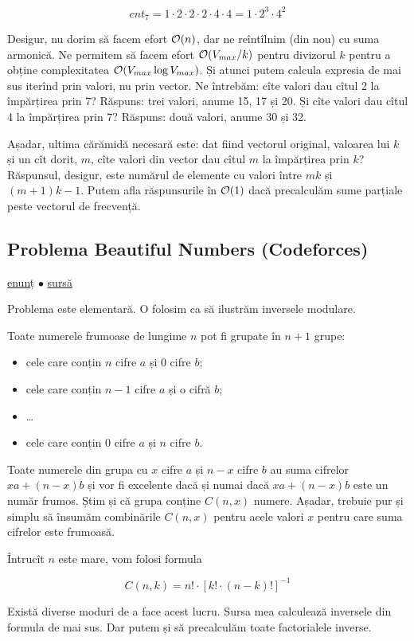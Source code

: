 \documentclass[../main.tex]{subfiles}
\begin{document}
$$cnt_7 = 1 \cdot 2 \cdot 2 \cdot 2 \cdot 4 \cdot 4 = 1 \cdot 2^3 \cdot 4^2$$

Desigur, nu dorim să facem efort $\mathcal{O}(n)$, dar ne reîntîlnim (din nou) cu suma armonică. Ne permitem să facem efort $\mathcal{O}(V_{max} / k)$ pentru divizorul $k$ pentru a obține complexitatea $\mathcal{O}(V_{max} \log V_{max})$. Și atunci putem calcula expresia de mai sus iterînd prin valori, nu prin vector. Ne întrebăm: cîte valori dau cîtul 2 la împărțirea prin 7? Răspuns: trei valori, anume 15, 17 și 20. Și cîte valori dau cîtul 4 la împărțirea prin 7? Răspuns: două valori, anume 30 și 32.

Așadar, ultima cărămidă necesară este: dat fiind vectorul original, valoarea lui $k$ și un cît dorit, $m$, cîte valori din vector dau cîtul $m$ la împărțirea prin $k$? Răspunsul, desigur, este numărul de elemente cu valori între $mk$ și $(m + 1)k - 1$. Putem afla răspunsurile în $\mathcal{O}(1)$ dacă precalculăm sume parțiale peste vectorul de frecvență.


\subsection{Problema Beautiful Numbers (Codeforces)}
\label{problem:beautiful-numbers}

\href{https://codeforces.com/contest/300/problem/C}{enunț}
$\bullet$
\hyperref[code:beautiful-numbers]{sursă}

Problema este elementară. O folosim ca să ilustrăm inversele modulare.

Toate numerele frumoase de lungime $n$ pot fi grupate în $n + 1$ grupe:

\begin{itemize}
  \item cele care conțin $n$ cifre $a$ și $0$ cifre $b$;
  \item cele care conțin $n-1$ cifre $a$ și o cifră $b$;
  \item \dots
  \item cele care conțin $0$ cifre $a$ și $n$ cifre $b$.
\end{itemize}

Toate numerele din grupa cu $x$ cifre $a$ și $n-x$ cifre $b$ au suma cifrelor $xa + (n-x)b$ și vor fi excelente dacă și numai dacă $xa + (n-x)b$ este un număr frumos. Știm și că grupa conține $C(n, x)$ numere. Așadar, trebuie pur și simplu să însumăm combinările $C(n, x)$ pentru acele valori $x$ pentru care suma cifrelor este frumoasă.

Întrucît $n$ este mare, vom folosi formula

$$C(n, k) = n! \cdot [k! \cdot (n-k)!]^{-1}$$

Există diverse moduri de a face acest lucru. Sursa mea calculează inversele din formula de mai sus. Dar putem și să precalculăm toate factorialele inverse.
\end{document}
